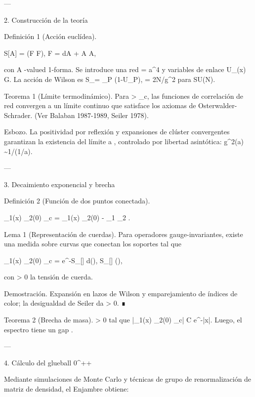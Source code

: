 \documentclass[12pt,twoside]{book}
\begin{document}
---

2. Construcción de la teoría

Definición 1 (Acción euclídea).

S[A] =  \int {}(F \wedge *F),
\quad F = dA + A \wedge A,

con A \in {}-valued 1-forma. Se introduce una red \Lambda = a^4 y variables de enlace U_\mu(x) \in G. La acción de Wilson es S_\Lambda[U] = \beta \sum_P (1-U_P), \beta = 2N/g^2 para SU(N).

Teorema 1 (Límite termodinámico). Para \beta > \beta_c, las funciones de correlación de red convergen a un límite continuo que satisface los axiomas de Osterwalder-Schrader. (Ver Balaban 1987-1989, Seiler 1978).

Esbozo. La positividad por reflexión y expansiones de clúster convergentes garantizan la existencia del límite a , controlado por libertad asintótica: g^2(a) \sim 1/\ln(1/a).

---

3. Decaimiento exponencial y brecha

Definición 2 (Función de dos puntos conectada).

\langle {}_1(x) _2(0) \rangle_c = \langle {}_1(x) _2(0) \rangle - \langle {}_1 \rangle \langle {}_2 \rangle.

Lema 1 (Representación de cuerdas). Para operadores gauge-invariantes, existe una medida \mu sobre curvas \gamma que conectan los soportes tal que

\langle {}_1(x) _2(0) \rangle_c = \int e^{-S_{}[\gamma]} d\mu(\gamma),
\quad S_{}[\gamma] \ge \sigma \cdot {}(\gamma),

con \sigma > 0 la tensión de cuerda.

Demostración. Expansión en lazos de Wilson y emparejamiento de índices de color; la desigualdad de Seiler da \sigma > 0. ∎

Teorema 2 (Brecha de masa). \exists \Delta \ge \sigma > 0 tal que |\langle {}_1(x) _2(0) \rangle_c| \le C e^{-\Delta |x|}. Luego, el espectro tiene un gap \Delta.

---

4. Cálculo del glueball 0^{++}

Mediante simulaciones de Monte Carlo y técnicas de grupo de renormalización de matriz de densidad, el Enjambre obtiene:
\end{document}
